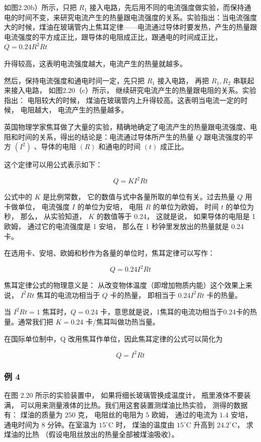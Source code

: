 如图2.20b）所示，只把 \(R_{1}\)
接入电路，先后用不同的电流强度做实验，而保持通电的时间不变，来研究电流产生的热量跟电流强度的关系。实验指出：当电流强度大的时候，煤油在玻璃管内上焦耳定律------电流通过导体时要发热，产生的热量跟电流强度的平方成正比，跟导体的电阻成正比，跟通电的时间成正比，
\(Q=0.24R^{2}Rt\)

升得较高，这表明电流强度越大，电流产生的热量就越多。

然后，保持电流强度和通电时间一定，先只把 \(R_{1}\) 接入电路， 再把
\(R_{1}, R_{2}\) 串联起来接入电路， 如图2.20（c）所示，
继续研究电流产生的热量跟电阻的关系。实验指出： 电阻较大的时候，
煤油在玻璃管内上升得较高。这表明当电流一定的时候， 电阻越大，
电流产生的热量越多。

英国物理学家焦耳做了大量的实验，精确地确定了电流产生的热量跟电流强度、电阻和时间的关系，得出的结论是：电流通过导体所产生的热量
\(Q\) 跟电流强度的平方 \((I^2)\) 、导体的电阻 \((R)\) 和通电的时间
\((t)\) 成正比。

这个定律可以用公式表示如下：

\[
Q = K I^{2} R t
\]

公式中的 \(K\) 是比例常数， 它的数值与式中各量所取的单位有关。过去热量
\(Q\) 用卡做单位， 电流强度 \(I\) 的单位为安培， 电阻 \(R\)
的单位为欧姆， 时间 \(t\) 的单位为秒， 那么， 从实验知道， \(K\)
的数值等于 0.24， 这就是说， 如果导体的电阻是 1 欧姆，
通过它的电流强度是 1 安培， 那么在 1 秒钟里发放出的热量就是 0.24 卡。

在选用卡、安培、欧姆和秒作为各量的单位时，焦耳定律可以写作：

\[
Q = 0.24 I^{2} R t
\]

焦耳定律公式的物理意义是：
从改变物体温度（即增加物质内能）这个效果上来说， \(I^{2}Rt\)
焦耳的电流功相当于 \(Q\) 卡的热量， 即相当于 \(0.24I^{2}Rt\) 卡的热量。

当 \(I^2 Rt = 1\) 焦耳时，\(Q = 0.24\)
卡，意思就是说，1焦耳的电流功相当于0.24卡的热量。通常我们把 \(K = 0.24\)
卡/焦耳叫做功热当量。

在国际单位制中，Q 改用焦耳作单位，因此焦耳定律的公式可以简化为

\[
Q = I^{2} R t
\]

\subsubsection{例 4}\label{ux4f8b-4-1}

在图 2.20 所示的实验装置中， 如果将细长玻璃管换成温度计，
瓶里液体不要装满，
可以用来测量液体的比热。我们用这套装置测煤油比热实验， 测得的数据有：
煤油的质量为 \(250\) 克， 电阻丝的电阻为 \(5\) 欧姆， 通过的电流为
\(1.4\) 安培， 通电时间为 \(8\) 分钟。在室温为 \(15^{\circ} \mathrm{C}\)
时， 煤油的温度由 \(15^{\circ} \mathrm{C}\) 升高到
\(24.2^{\circ} \mathrm{C}\)， 求煤油的比热
（假设电阻丝放出的热量全部被煤油吸收）。

